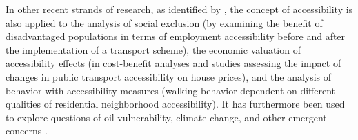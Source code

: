 In other recent strands of research, as identified by \citet{GeursEtAl2012AccessibilityTransportIntroduction},
the concept of accessibility is also applied to the analysis of social exclusion (\eg by examining the benefit of
disadvantaged populations in terms of employment accessibility before and after the implementation of a 
transport scheme), the economic valuation of accessibility effects (\eg in cost-benefit analyses and studies 
assessing the impact of changes in public transport accessibility on house prices), and the analysis of behavior 
with accessibility measures (\eg walking behavior dependent on different qualities of residential neighborhood 
accessibility). It has furthermore been used to explore questions of oil vulnerability, climate change, and 
other emergent concerns \citep{CurtisEtAl2013AccessibilityPolicyInnovation}.



